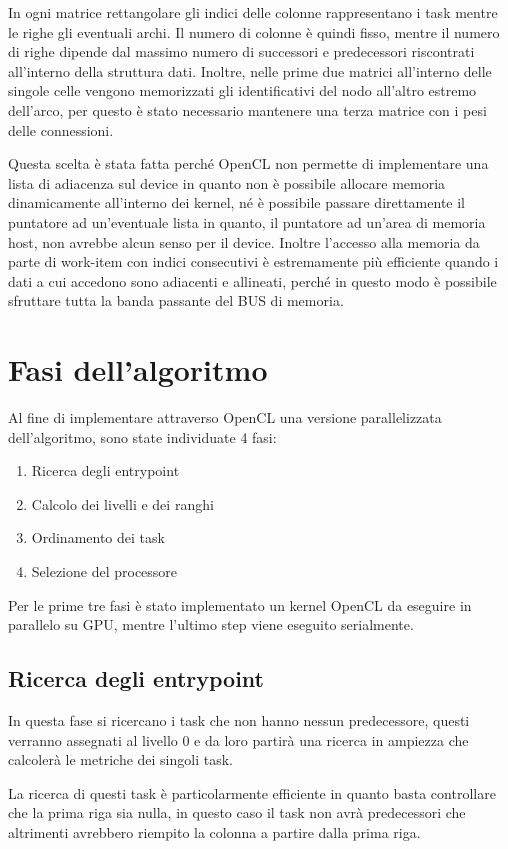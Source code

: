 In ogni matrice rettangolare gli indici delle colonne rappresentano i task mentre le righe gli eventuali archi. Il numero di colonne è quindi fisso, mentre il numero di righe dipende dal massimo numero di successori e predecessori riscontrati all'interno della struttura dati. Inoltre, nelle prime due matrici all'interno delle singole celle vengono memorizzati gli identificativi del nodo all'altro estremo dell'arco, per questo è stato necessario mantenere una terza matrice con i pesi delle connessioni.

Questa scelta è stata fatta perché OpenCL non permette di implementare una lista di adiacenza sul device in quanto non è possibile allocare memoria dinamicamente all'interno dei kernel, né è possibile passare direttamente il puntatore ad un'eventuale lista in quanto, il puntatore ad un'area di memoria host, non avrebbe alcun senso per il device. Inoltre l'accesso alla memoria da parte di work-item con indici consecutivi è estremamente più efficiente quando i dati a cui accedono sono adiacenti e allineati, perché in questo modo è possibile sfruttare tutta la banda passante del BUS di memoria. 


\section{Fasi dell'algoritmo}
Al fine di implementare attraverso OpenCL una versione parallelizzata dell'algoritmo, sono state individuate 4 fasi:

\begin{enumerate}
	\item Ricerca degli entrypoint
	\item Calcolo dei livelli e dei ranghi
	\item Ordinamento dei task
	\item Selezione del processore
\end{enumerate}
Per le prime tre fasi è stato implementato un kernel OpenCL da eseguire in parallelo su GPU, mentre l'ultimo step viene eseguito serialmente.

\subsection{Ricerca degli entrypoint}
In questa fase si ricercano i task che non hanno nessun predecessore, questi verranno assegnati al livello 0 e da loro partirà una ricerca in ampiezza che calcolerà le metriche dei singoli task.

La ricerca di questi task è particolarmente efficiente in quanto basta controllare che la prima riga sia nulla, in questo caso il task non avrà predecessori che altrimenti avrebbero riempito la colonna a partire dalla prima riga.\\

